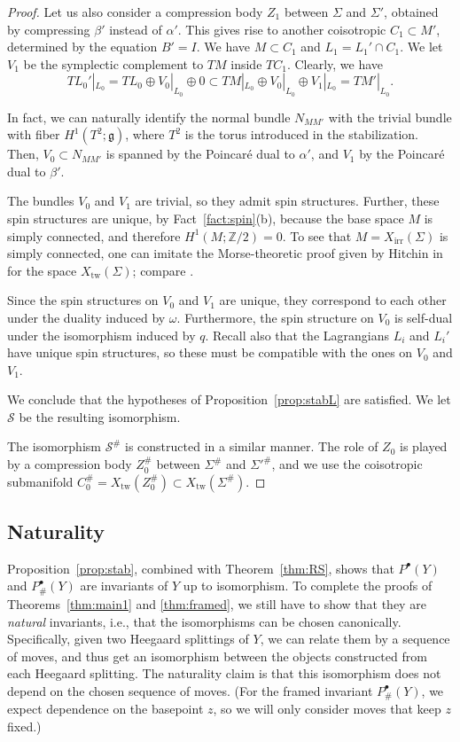 \documentclass [11pt]{amsart}
\theoremstyle{remark}
\def\zz {{\mathbb{Z}}}
\def\Z {\zz}
\def\g{\mathfrak{g}}
\def\Char {X}
\def\CharIrr {\Char_{\operatorname{irr}}}
\def\Xtw{\Char_{\operatorname{tw}}}
\def\Stab{\mathscr{S}}
\begin{document}
\begin{proof}
Let us also consider a compression body $Z_1$ between $\Sigma$ and $\Sigma'$, obtained by compressing $\beta'$ instead of $\alpha'$. This gives rise to another coisotropic $C_1 \subset M'$, determined by the equation $B'=I$. We have $M \subset C_1$ and $L_1 = L_1' \cap C_1$. We let $V_1$ be the symplectic complement to $TM$ inside $TC_1$.  Clearly, we have
$$ TL_0'|_{L_0} = TL_0 \oplus V_0|_{L_0} \oplus 0 \subset TM|_{L_0} \oplus V_0|_{L_0} \oplus V_1|_{L_0} =TM'|_{L_0}.$$

In fact, we can naturally identify the normal bundle $N_{MM'}$ with the trivial bundle with fiber $H^1(T^2; \g)$, where $T^2$ is the torus introduced in the stabilization. Then, $V_0 \subset N_{MM'}$ is spanned by the Poincar\'e dual to $\alpha'$, and $V_1$ by the Poincar\'e dual to $\beta'$.

The bundles $V_0$ and $V_1$ are trivial, so they admit spin structures. Further, these spin structures are unique, by Fact~\ref{fact:spin}(b), because the base space $M$ is simply connected, and therefore $H^1(M; \Z/2)=0$. To see that $M=\CharIrr(\Sigma)$ is simply connected, one can imitate the Morse-theoretic proof given by Hitchin in \cite[Theorem 9.20]{Hitchin} for the space $\Xtw(\Sigma)$; compare \cite[Section 4]{DWW}. 

Since the spin structures on $V_0$ and $V_1$ are unique, they correspond to each other under the duality induced by $\omega$. Furthermore, the spin structure on $V_0$ is self-dual under the isomorphism induced by $q$. Recall also that the Lagrangians $L_i$ and $L_i'$ have unique spin structures, so these must be compatible with the ones on $V_0$ and $V_1$.

We conclude that the hypotheses of Proposition~\ref{prop:stabL} are satisfied. We let $\Stab$ be the resulting isomorphism.

The isomorphism $\Stab^{\#}$ is constructed in a similar manner. The role of $Z_0$ is played by a compression body $Z_0^{\#}$ between $\Sigma^{\#}$ and ${\Sigma'}^{\#}$, and we use the coisotropic submanifold $C^{\#}_0 = \Xtw(Z^{\#}_0) \subset \Xtw(\Sigma^{\#})$.
\end{proof}


\subsection{Naturality}
\label{sec:naturality}
Proposition~\ref{prop:stab}, combined with Theorem~\ref{thm:RS}, shows that $P^{\bullet}(Y)$ and $P^{\bullet}_\#(Y)$ are invariants of $Y$ up to isomorphism. To complete the proofs of Theorems~\ref{thm:main1} and \ref{thm:framed}, we still have to show that they are {\em natural} invariants, i.e., that the isomorphisms can be chosen canonically. Specifically, given two Heegaard splittings of $Y$, we can relate them by a sequence of moves, and thus get an isomorphism between the objects constructed from each Heegaard splitting. The naturality claim is that this isomorphism does not depend on the chosen sequence of moves. (For the framed invariant $P^{\bullet}_\#(Y)$, we expect dependence on the basepoint $z$, so we will only consider moves that keep $z$ fixed.)
\end{document}
